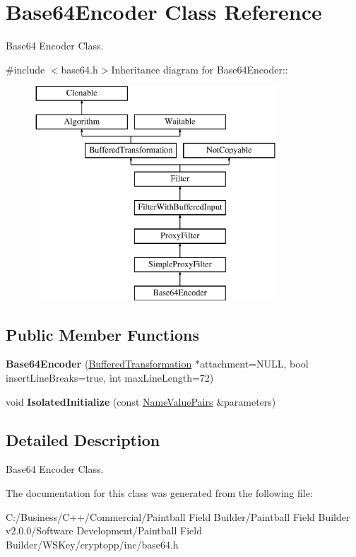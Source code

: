 \hypertarget{class_base64_encoder}{
\section{Base64Encoder Class Reference}
\label{class_base64_encoder}
}


Base64 Encoder Class.  


{\ttfamily \#include $<$base64.h$>$}Inheritance diagram for Base64Encoder::\begin{figure}[H]
\begin{center}
\leavevmode
\includegraphics[height=8cm]{class_base64_encoder}
\end{center}
\end{figure}
\subsection*{Public Member Functions}
\begin{DoxyCompactItemize}
\item 
\hypertarget{class_base64_encoder_ac0ac934fda9b7bc7df73635fc3313647}{
{\bfseries Base64Encoder} (\hyperlink{class_buffered_transformation}{BufferedTransformation} $\ast$attachment=NULL, bool insertLineBreaks=true, int maxLineLength=72)}
\label{class_base64_encoder_ac0ac934fda9b7bc7df73635fc3313647}

\item 
\hypertarget{class_base64_encoder_afc7466a518ec03be6d36696df3ff50a6}{
void {\bfseries IsolatedInitialize} (const \hyperlink{class_name_value_pairs}{NameValuePairs} \&parameters)}
\label{class_base64_encoder_afc7466a518ec03be6d36696df3ff50a6}

\end{DoxyCompactItemize}


\subsection{Detailed Description}
Base64 Encoder Class. 

The documentation for this class was generated from the following file:\begin{DoxyCompactItemize}
\item 
C:/Business/C++/Commercial/Paintball Field Builder/Paintball Field Builder v2.0.0/Software Development/Paintball Field Builder/WSKey/cryptopp/inc/base64.h\end{DoxyCompactItemize}

